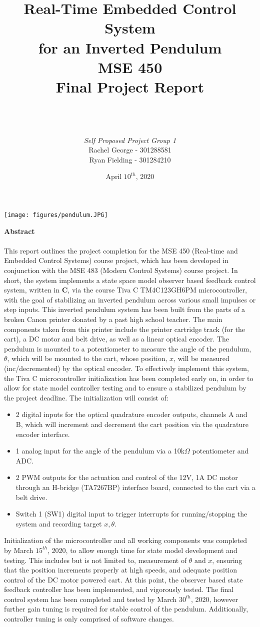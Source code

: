 \documentclass[12pt]{article}
\title{\textbf{Real-Time Embedded Control System\\ for an Inverted Pendulum\\} \bigskip MSE 450\\Final Project Report}
\author{\\ \\ \\\textit{Self Proposed Project Group 1}\\ Rachel George -  301288581 \\ Ryan Fielding - 301284210}
\date{April $10^{th}$, 2020}
\begin{document}
\maketitle
\begin{center}
    \texttt{[image: figures/pendulum.JPG]}
\end{center}

\newpage

{\Large \textbf{Abstract\\\\}}
This report outlines the project completion for the MSE 450 (Real-time and Embedded Control Systems) course project, which has been developed in conjunction with the MSE 483 (Modern Control Systems) course project. In short, the system implements a state space model observer based feedback control system, written in \textbf{C}, via the course Tiva C TM4C123GH6PM microcontroller, with the goal of stabilizing an inverted pendulum across various small impulses or step inputs. This inverted pendulum system has been built from the parts of a broken Canon printer donated by a past high school teacher. The main components taken from this printer include the printer cartridge track (for the cart), a DC motor and belt drive, as well as a linear optical encoder. The pendulum is mounted to a potentiometer to measure the angle of the pendulum, $\theta$, which will be mounted to the cart, whose position, $x$, will be measured (inc/decremented) by the optical encoder. To effectively implement this system, the Tiva C microcontroller initialization has been completed early on, in order to allow for state model controller testing and to ensure a stabilized pendulum by the project deadline. The initialization will consist of:
\begin{itemize}
\item 2 digital inputs for the optical quadrature encoder outputs, channels A and B, which will increment and decrement the cart position via the quadrature encoder interface.
\item 1 analog input for the angle of the pendulum via a 10k$\Omega$ potentiometer and ADC.
\item 2 PWM outputs for the actuation and control of the 12V, 1A DC motor through an H-bridge (TA7267BP) interface board, connected to the cart via a belt drive.
\item Switch 1 (SW1) digital input to trigger interrupts for running/stopping the system and recording target $x,\theta$.
\end{itemize}
Initialization of the microcontroller and all working components was completed by March $15^{th}$, 2020, to allow enough time for state model development and testing. This includes but is not limited to, measurement of $\theta \textrm{ and } x$, ensuring that the position increments properly at high speeds, and adequate position control of the DC motor powered cart. At this point, the observer based state feedback controller has been implemented, and vigorously tested. The final control system has been completed and tested by March $30^{th}$, 2020, however further gain tuning is required for stable control of the pendulum. Additionally, controller tuning is only comprised of software changes.\bigskip
\end{document}
